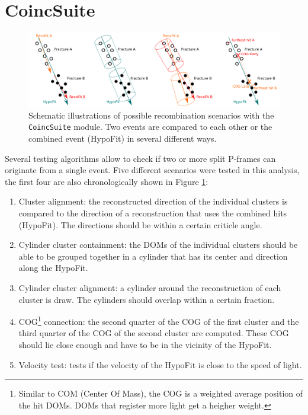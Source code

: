 \section{CoincSuite}
\begin{figure}[t]
\centering
\includegraphics[width=\textwidth]{chapter7/img/coincsuite.png}
\caption{Schematic illustrations of possible recombination scenarios with the \texttt{CoincSuite} module. Two events are compared to each other or the combined event (HypoFit) in several different ways.}
\label{fig:coincsuite}
\end{figure}
Several testing algorithms allow to check if two or more split P-frames can originate from a single event. Five different scenarios were tested in this analysis, the first four are also chronologically shown in Figure \ref{fig:coincsuite}:
\vspace{2mm}

\begin{enumerate}
\item Cluster alignment: the reconstructed direction of the individual clusters is compared to the direction of a reconstruction that uses the combined hits (HypoFit). The directions should be within a certain criticle angle.
\item Cylinder cluster containment: the DOMs of the individual clusters should be able to be grouped together in a cylinder that has its center and direction along the HypoFit.
\item Cylinder cluster alignment: a cylinder around the reconstruction of each cluster is draw. The cylinders should overlap within a certain fraction.
\item COG\footnote{Similar to COM (Center Of Mass), the COG is a weighted average position of the hit DOMs. DOMs that register more light get a heigher weight.} connection: the second quarter of the COG of the first cluster and the third quarter of the COG of the second cluster are computed. These COG should lie close enough and have to be in the vicinity of the HypoFit.
\item Velocity test: tests if the velocity of the HypoFit is close to the speed of light.
\end{enumerate}

